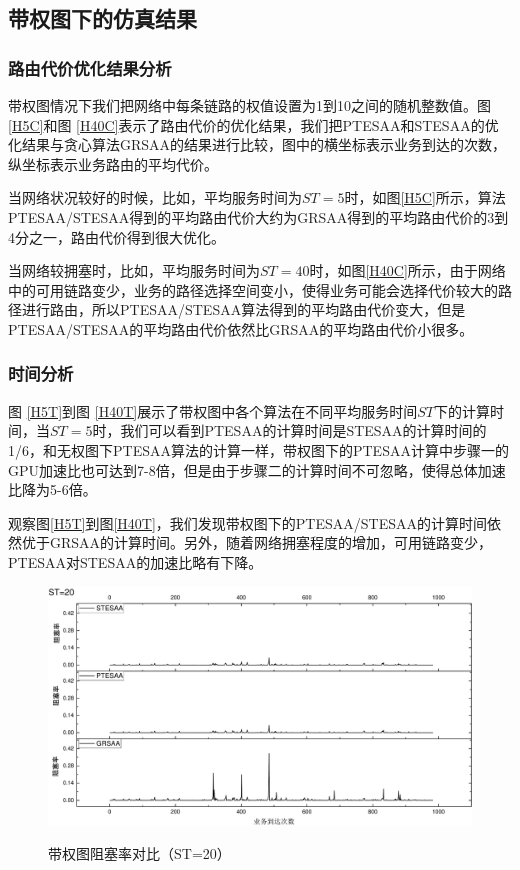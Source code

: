 \subsection{带权图下的仿真结果}
\subsubsection{路由代价优化结果分析}
带权图情况下我们把网络中每条链路的权值设置为1到10之间的随机整数值。图 \ref{H5C}和图 \ref{H40C}表示了路由代价的优化结果，我们把PTESAA和STESAA的优化结果与贪心算法GRSAA的结果进行比较，图中的横坐标表示业务到达的次数，纵坐标表示业务路由的平均代价。

当网络状况较好的时候，比如，平均服务时间为$ST=5$时，如图\ref{H5C}所示，算法PTESAA/STESAA得到的平均路由代价大约为GRSAA得到的平均路由代价的3到4分之一，路由代价得到很大优化。

当网络较拥塞时，比如，平均服务时间为$ST=40$时，如图\ref{H40C}所示，由于网络中的可用链路变少，业务的路径选择空间变小，使得业务可能会选择代价较大的路径进行路由，所以PTESAA/STESAA算法得到的平均路由代价变大，但是PTESAA/STESAA的平均路由代价依然比GRSAA的平均路由代价小很多。

\subsubsection{时间分析}
图 \ref{H5T}到图 \ref{H40T}展示了带权图中各个算法在不同平均服务时间$ST$下的计算时间，当$ST=5$时，我们可以看到PTESAA的计算时间是STESAA的计算时间的1/6，和无权图下PTESAA算法的计算一样，带权图下的PTESAA计算中步骤一的GPU加速比也可达到7-8倍，但是由于步骤二的计算时间不可忽略，使得总体加速比降为5-6倍。

观察图\ref{H5T}到图\ref{H40T}，我们发现带权图下的PTESAA/STESAA的计算时间依然优于GRSAA的计算时间。另外，随着网络拥塞程度的增加，可用链路变少，PTESAA对STESAA的加速比略有下降。
\begin{figure}
\setlength{\abovecaptionskip}{-0.5cm}
\begin{center}
{\includegraphics[width=0.8 \textwidth]{figures/H20Z.pdf}}
\end{center}
\caption{{\footnotesize{带权图阻塞率对比（ST=20）}}}
\label{H30Z}
\end{figure}



